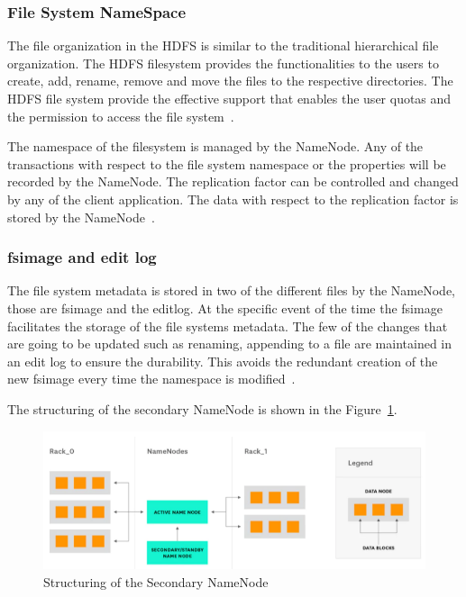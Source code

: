 \subsubsection{File System NameSpace}
The file organization in the HDFS is similar to the 
traditional hierarchical file organization. The HDFS 
filesystem provides the functionalities to the users to create, 
add, rename, remove and move the files to the respective directories. 
The HDFS file system provide the effective support that 
enables the user quotas and the 
permission to access the file system~\cite{hid-sp18-412-HDFS-Architecture}. 

The namespace of the filesystem is managed by the NameNode. 
Any of the transactions with respect to the file system 
namespace or the properties will be recorded by the NameNode. 
The replication factor can be controlled and changed by 
any of the client application. The data with respect to the 
replication factor is 
stored by the NameNode~\cite{hid-sp18-412-HDFS-Architecture}.

\subsubsection{fsimage and edit log}
The file system metadata is stored in two of the 
different files by the NameNode, those are fsimage 
and the editlog. At the specific event of the time 
the fsimage facilitates the storage of the file 
systems metadata. The few of the changes that are going 
to be updated such as renaming, appending to a 
file are maintained in an edit log to ensure the durability. 
This avoids the redundant creation of the 
new fsimage every time the 
namespace is modified~\cite{hid-sp18-412-hadoop-architecture-overview}. 

The structuring of the secondary NameNode is 
shown in the Figure~\ref{s:secnode}.

\begin{figure}[!ht]
\centering
\includegraphics[width=\textwidth]{images/StructureOfSecondaryNode.png}
\caption{Structuring of the Secondary 
NameNode~\cite{hid-sp18-412-hadoop-architecture-overview}}\label{s:secnode}
\end{figure}

